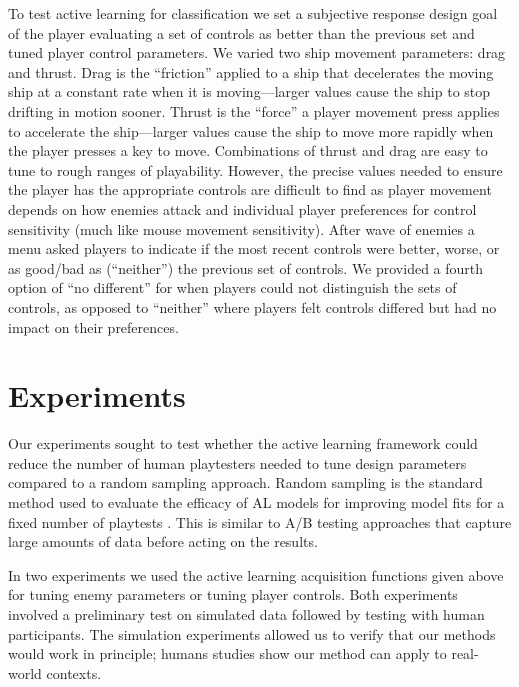 \documentclass{sig-alternate}
\begin{document}
To test active learning for classification we set a subjective response design goal of the player evaluating a set of controls as better than the previous set and tuned player control parameters.
We varied two ship movement parameters: drag and thrust. 
Drag is the ``friction'' applied to a ship that decelerates the moving ship at a constant rate when it is moving---larger values cause the ship to stop drifting in motion sooner. 
Thrust is the ``force'' a player movement press applies to accelerate the ship---larger values cause the ship to move more rapidly when the player presses a key to move. 
%
Combinations of thrust and drag are easy to tune to rough ranges of playability.
However, the precise values needed to ensure the player has the appropriate controls are difficult to find as player movement depends on how enemies attack and individual player preferences for control sensitivity (much like mouse movement sensitivity). 
After wave of enemies a menu asked players to indicate if the most recent controls were better, worse, or as good/bad as (``neither'') the previous set of controls.
We provided a fourth option of ``no different'' for when players could not distinguish the sets of controls, as opposed to ``neither'' where players felt controls differed but had no impact on their preferences.





\section{Experiments}
Our experiments sought to test whether the active learning framework could reduce the number of human playtesters needed to tune design parameters compared to a random sampling approach.
Random sampling is the standard method used to evaluate the efficacy of AL models for improving model fits for a fixed number of playtests \cite{settles2012:al-book}. This is similar to A/B testing approaches that capture large amounts of data before acting on the results.

In two experiments we used the active learning acquisition functions given above for tuning enemy parameters or tuning player controls.
Both experiments involved a preliminary test on simulated data followed by testing with human participants.
The simulation experiments allowed us to verify that our methods would work in principle; humans studies show our method can apply to real-world contexts.
\end{document}
